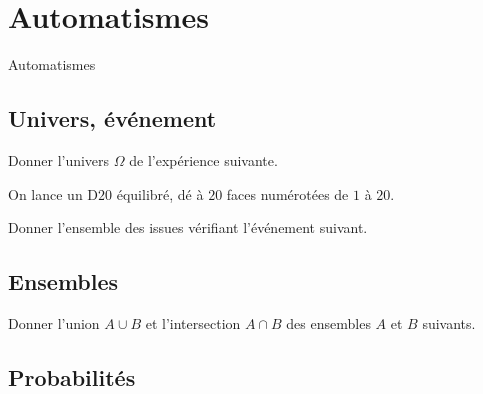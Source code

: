 



\section{Automatismes}

\begin{frame}

\centering \huge
Automatismes

\end{frame}

\subsection{Univers, événement}

\begin{frame}{1}
	Donner l'univers $\Omega$ de l'expérience suivante.
\end{frame}


\begin{frame}{2}
	On lance un D$20$ équilibré, dé à $20$ faces numérotées de $1$ à $20$.
	
	Donner l'ensemble des issues vérifiant l'événement suivant.
	
\end{frame}

\subsection{Ensembles}

\begin{frame}{3}
	Donner l'union $A\cup B$ et l'intersection $A\cap B$ des ensembles $A$ et $B$ suivants.
	
\end{frame}

\subsection{Probabilités}


